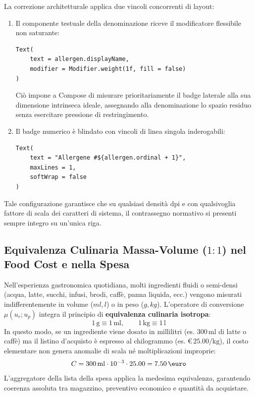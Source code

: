 \documentclass[11pt,a4paper,titlepage]{article}
\begin{document}
La correzione architetturale applica due vincoli concorrenti di layout:
\begin{enumerate}
    \item Il componente testuale della denominazione riceve il modificatore flessibile non saturante:
    \begin{lstlisting}[caption={Vincolo dimensionale flessibile per la label dell'allergene}]
Text(
    text = allergen.displayName,
    modifier = Modifier.weight(1f, fill = false)
)
    \end{lstlisting}
    Ci\`o impone a Compose di misurare prioritariamente il badge laterale alla sua dimensione intrinseca ideale, assegnando alla denominazione lo spazio residuo senza esercitare pressione di restringimento.
    \item Il badge numerico \`e blindato con vincoli di linea singola inderogabili:
    \begin{lstlisting}[caption={Inibizione del wrapping sul badge identificativo}]
Text(
    text = "Allergene #${allergen.ordinal + 1}",
    maxLines = 1,
    softWrap = false
)
    \end{lstlisting}
\end{enumerate}
Tale configurazione garantisce che su qualsiasi densit\`a dpi e con qualsivoglia fattore di scala dei caratteri di sistema, il contrassegno normativo si presenti sempre integro su un'unica riga.

\subsection{Equivalenza Culinaria Massa-Volume ($1:1$) nel Food Cost e nella Spesa}
Nell'esperienza gastronomica quotidiana, molti ingredienti fluidi o semi-densi (acqua, latte, succhi, infusi, brodi, caff\`e, panna liquida, ecc.) vengono misurati indifferentemente in volume ($ml, l$) o in peso ($g, kg$). L'operatore di conversione $\mu(u_r; u_p)$ integra il principio di \textbf{equivalenza culinaria isotropa}:
$$1\,\text{g} \equiv 1\,\text{ml}, \qquad 1\,\text{kg} \equiv 1\,\text{l}$$
In questo modo, se un ingrediente viene dosato in millilitri (es. $300\,\text{ml}$ di latte o caff\`e) ma il listino d'acquisto \`e espresso al chilogrammo (es. \euro\,$25.00/\text{kg}$), il costo elementare non genera anomalie di scala n\'e moltiplicazioni improprie:
$$C = 300\,\text{ml} \cdot 10^{-3} \cdot 25.00 = 7.50\,\text{\euro}$$
L'aggregatore della lista della spesa applica la medesima equivalenza, garantendo coerenza assoluta tra magazzino, preventivo economico e quantit\`a da acquistare.
\end{document}
